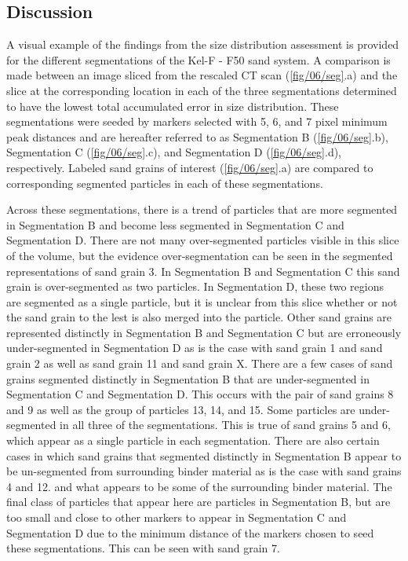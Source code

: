 \subsection{Discussion}
A visual example of the findings from the size distribution
assessment is provided for the different segmentations of the
Kel-F - F50 sand system. A comparison is made between an image sliced from
the rescaled CT scan (\ref{fig/06/seg}.a) and the slice at the
corresponding location in each of the three segmentations determined to have
the lowest total accumulated error in size distribution. These segmentations
were seeded by markers selected with 5, 6, and 7 pixel minimum peak
distances and are hereafter referred to as
Segmentation B (\ref{fig/06/seg}.b), Segmentation C
(\ref{fig/06/seg}.c), and Segmentation D (\ref{fig/06/seg}.d),
respectively. Labeled sand grains of interest (\ref{fig/06/seg}.a) are
compared to corresponding segmented particles in each of these segmentations.

Across these segmentations, there is a trend of particles that are more
segmented in Segmentation B and become less segmented in Segmentation C and
Segmentation D.
There are not many over-segmented particles visible in this slice of the
volume, but the evidence over-segmentation can be seen in the segmented
representations of sand grain 3. In Segmentation B and Segmentation C this
sand grain is over-segmented as two particles. In Segmentation D, these two
regions are segmented as a single particle, but it is unclear from this
slice whether or not the sand grain to the lest is also merged into the
particle. Other sand grains are represented distinctly in Segmentation B
and Segmentation C but are erroneously under-segmented in Segmentation
D as is the case with sand grain 1 and sand grain 2 as well as sand grain 11
and sand grain X.
There are a few cases of sand grains segmented distinctly in Segmentation B
that are under-segmented in Segmentation C and Segmentation D. This occurs with
the pair of sand grains 8 and 9 as well as the group of particles 13, 14,
and 15.
Some particles are under-segmented in all three of the segmentations. This is
true of sand grains 5 and 6, which appear as a single particle in each
segmentation.
There are also certain cases in which sand grains that segmented distinctly in
Segmentation B appear to be un-segmented from surrounding binder material as
is the case with sand grains 4 and 12.
and what appears to be some of the surrounding binder material.
The final class of particles that appear here are particles in Segmentation B,
but are too small and close to other markers to appear in Segmentation C and
Segmentation D due to the minimum distance of the markers chosen to seed
these segmentations. This can be seen with sand grain 7.

